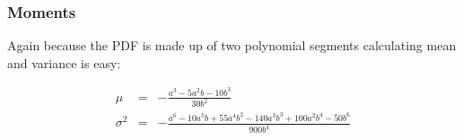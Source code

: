 \subsubsection{Moments}

Again because the PDF is made up of two polynomial segments calculating mean and variance is easy:

\begin{eqnarray}
 \mu &= &-\frac{a^3-5 a^2 b-10 b^3}{30 b^2}\\
 \sigma^{2} & = & -\frac{a^6-10 a^5 b+55 a^4 b^2-140 a^3 b^3+100 a^2 b^4-50 b^6}{900 b^4}
\end{eqnarray}






